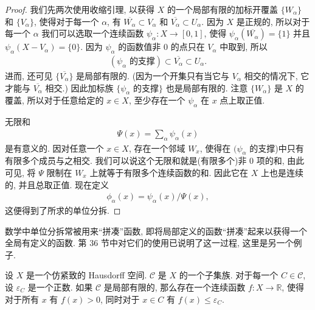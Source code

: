 \documentclass[../../main.tex]{subfiles}
\begin{document}
\begin{proof}
我们先两次使用收缩引理, 以获得 $X$ 的一个局部有限的加标开覆盖 $\{W_\alpha\}$ 和 $\{V_\alpha\}$, 使得对于每一个 $\alpha$, 有 $\overline{W_\alpha}\subset V_\alpha$ 和 $\overline{V_\alpha}\subset U_\alpha$. 因为 $X$ 是正规的, 所以对于每一个 $\alpha$ 我们可以选取一个连续函数 $\psi_\alpha\colon X\to[0,1]$, 使得 $\psi_\alpha(\overline{W_\alpha})=\{1\}$ 并且 $\psi_\alpha(X-V_\alpha)=\{0\}$. 因为 $\psi_\alpha$ 的函数值非 $0$ 的点只在 $V_\alpha$ 中取到, 所以
\begin{align*}
(\psi_\alpha\text{ 的支撑})\subset\overline{V_\alpha}\subset U_\alpha.
\end{align*}
进而, 还可见 $\{\overline{V_\alpha}\}$ 是局部有限的. (因为一个开集只有当它与 $V_\alpha$ 相交的情况下, 它才能与 $\overline{V_\alpha}$ 相交.) 因此加标族 $\{\psi_\alpha$ 的支撑$\}$ 也是局部有限的. 注意 $\{W_\alpha\}$ 是 $X$ 的覆盖, 所以对于任意给定的 $x\in X$, 至少存在一个 $\psi_\alpha$ 在 $x$ 点上取正值.

无限和
\begin{align*}
\Psi(x)=\sum_\alpha\psi_\alpha(x)
\end{align*}
是有意义的. 因对任意一个 $x\in X$, 存在一个邻域 $W_x$, 使得在 $(\psi_\alpha$ 的支撑)中只有有限多个成员与之相交. 我们可以说这个无限和就是(有限多个)非 $0$ 项的和, 由此可见, 将 $\Psi$ 限制在 $W_x$ 上就等于有限多个连续函数的和. 因此它在 $X$ 上也是连续的, 并且总取正值. 现在定义
\begin{align*}
\phi_\alpha(x)=\psi_\alpha(x)/\Psi(x),
\end{align*}
这便得到了所求的单位分拆.
\end{proof}

数学中单位分拆常被用来``拼凑''函数, 即将局部定义的函数``拼凑''起来以获得一个全局有定义的函数. 第 36 节中对它们的使用已说明了这一过程, 这里是另一个例子.

\begin{theorem}\label{theorem:ch06-positive-function}
设 $X$ 是一个仿紧致的 Hausdorff 空间. $\mathcal{C}$ 是 $X$ 的一个子集族. 对于每一个 $C\in\mathcal{C}$, 设 $\varepsilon_C$ 是一个正数. 如果 $\mathcal{C}$ 是局部有限的, 那么存在一个连续函数 $f\colon X\to\mathbb{R}$, 使得对于所有 $x$ 有 $f(x)>0$, 同时对于 $x\in C$ 有 $f(x)\leqslant\varepsilon_C$.
\end{theorem}
\end{document}
